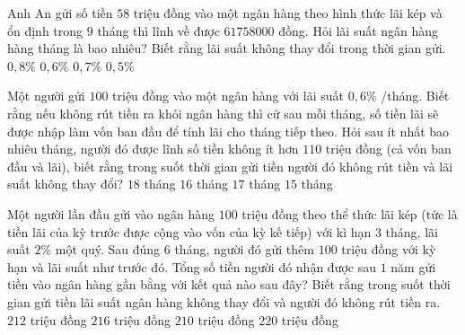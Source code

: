 \begin{ex}%
    Anh An gửi số tiền $58$ triệu đồng vào một ngân hàng theo hình thức lãi kép và ổn định trong $9$ tháng thì lĩnh về được $61758000$ đồng. Hỏi lãi suất ngân hàng hàng tháng là bao nhiêu? Biết rằng lãi suất không thay đổi trong thời gian gửi.
    \choice
    {$0{,}8\%$}
    {$0{,}6\%$}
    {\True $0{,}7\%$}
    {$0{,}5\%$}
\end{ex}
\begin{ex}%
    [Chuyên Bắc Giang 2019]%
    Một người gửi $100$ triệu đồng vào một ngân hàng với lãi suất $0{,}6\%$ /tháng. Biết rằng nếu không rút tiền ra khỏi ngân hàng thì cứ sau mỗi tháng, số tiền lãi sẽ được nhập làm vốn ban đầu để tính lãi cho tháng tiếp theo. Hỏi sau ít nhất bao nhiêu tháng, người đó được lĩnh số tiền không ít hơn $110$ triệu đồng (cả vốn ban đầu và lãi), biết rằng trong suốt thời gian gửi tiền người đó không rút tiền và lãi suất không thay đổi?
    \choice
    {$ 18$ tháng}
    {\True $ 16$ tháng}
    {$ 17$ tháng}
    {$ 15$ tháng}
\end{ex}
\begin{ex}%
    Một người lần đầu gửi vào ngân hàng $100$ triệu đồng theo thể thức lãi kép (tức là tiền lãi của kỳ trước được cộng vào vốn của kỳ kế tiếp) với kì hạn $3$ tháng, lãi suất $2\%$ một quý. Sau đúng $6$ tháng, người đó gửi thêm $100$ triệu đồng với kỳ hạn và lãi suất như trước đó. Tổng số tiền người đó nhận được sau $1$ năm gửi tiền vào ngân hàng gần bằng với kết quả nào sau đây? Biết rằng trong suốt thời gian gửi tiền lãi suất ngân hàng không thay đổi và người đó không rút tiền ra.
    \choice
    {\True $212$ triệu đồng}
    {$216$ triệu đồng}
    {$210$ triệu đồng}
    {$220$ triệu đồng}
\end{ex}
